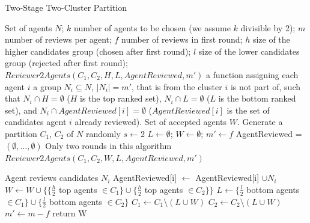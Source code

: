 \documentclass[letterpaper]{article}
\begin{document}
\begin{algorithm}[t]
\small
\caption{Two-Stage Two-Cluster Partition}\label{2StagePartition}
\begin{algorithmic}[1]
\Require
Set of agents $N$; %
\newline
$k$ number of agents to be chosen (we assume $k$ divisible by 2);
\newline
$m$ number of reviews per agent;
\newline
$f$ number of reviews in first round;
\newline
$h$ size of the higher candidates group (chosen after first round);
\newline
$l$ size of the lower candidates group (rejected after first round);
\newline
$Reviewer2Agents(C_{1},C_{2},H,L,AgentReviewed,m')$ a function assigning each agent $i$ a group $N_{i}\subseteq N$, $|N_{i}|=m'$, that is from the cluster $i$ is not part of, such that $N_{i}\cap H=\emptyset$ ($H$ is the top ranked set), $N_{i}\cap L=\emptyset$ ($L$ is the bottom ranked set), and $N_{i}\cap AgentReviewed[i]=\emptyset$ ($AgentReviewed[i]$ is the set of candidates agent $i$ already reviewed).
\newline
\Ensure Set of accepted agents $W$.
\State Generate a partition {$C_{1}$, $C_{2}$} of $N$ randomly
\State $s \gets 2$ 
\State $L \gets \emptyset$; 
\State $W \gets \emptyset$; 
\State $m' \gets f$ 
\State AgentReviewed = $(\emptyset , \ldots , \emptyset)$
 \Comment Only two rounds in this algorithm
 \State $Reviewer2Agents(C_{1},C_{2},W,L,AgentReviewed,m')$

 \State Agent reviews candidates $N_{i}$ %
 \State AgentReviewed[i] $\gets$ AgentReviewed[i] $\cup N_{i}$
 \EndFor
 \State $W \gets W \cup \{ \{ \frac{h}{2}$ top agents $\in C_{1} \} \cup \{ \frac{h}{2}$ top agents $\in C_{2} \} \}$
 \State $L \gets \{ \frac{l}{2}$ bottom agents $\in C_{1} \} \cup \{ \frac{l}{2}$ bottom agents $\in C_{2} \}$
 \State $C_{1}\gets C_{1}\setminus (L\cup W)$
 \State $C_{2}\gets C_{2}\setminus (L\cup W)$
 \State $m' \gets m-f$
\EndFor
\State return W
\end{algorithmic}
\end{algorithm}
\normalsize
\end{document}
